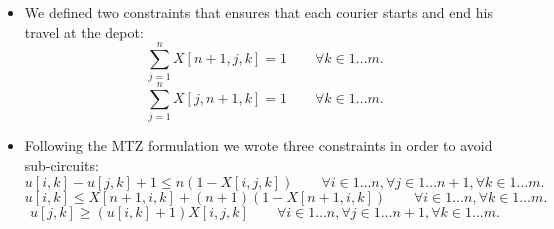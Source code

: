 \begin{itemize}
    \item We defined two constraints that ensures that each courier starts and end his travel at the depot:
    \begin{equation}
        \sum_{j = 1}^{n} X[n+1,j,k] = 1 \qquad \forall k \in 1 \dots m.
    \end{equation}
    \begin{equation}
        \sum_{j = 1}^{n} X[j,n+1,k] = 1 \qquad \forall k \in 1 \dots m.
    \end{equation}

    \item Following the MTZ formulation we wrote three constraints in order to avoid sub-circuits:
    \begin{equation}
        u[i,k] - u[j,k] + 1 \leq n(1 - X[i,j,k]) \qquad \forall i \in 1 \dots n, \forall j \in 1 \dots n+1, \forall k \in 1 \dots m.
    \end{equation}
    \begin{equation}
        u[i,k] \leq X[n+1,i,k] + (n+1)(1-X[n+1,i,k]) \qquad \forall i \in 1 \dots n, \forall k \in 1 \dots m.
    \end{equation}
    \begin{equation}
        u[j,k] \geq (u[i,k] + 1)X[i,j,k] \qquad \forall i \in 1 \dots n, \forall j \in 1 \dots n+1, \forall k \in 1 \dots m.
    \end{equation}


\end{itemize}
